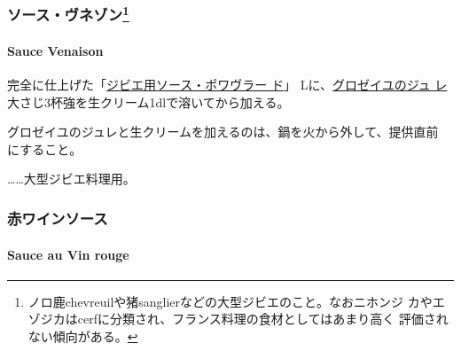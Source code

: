 \begin{recette}
\maeaki

\hypertarget{ux30bdux30fcux30b9ux30f4ux30cdux30beux30f395}{%
\subsubsection[ソース・ヴネゾン]{\texorpdfstring{ソース・ヴネゾン\footnote{ノロ鹿chevreuilや猪sanglierなどの大型ジビエのこと。なおニホンジ
  カやエゾジカはcerfに分類され、フランス料理の食材としてはあまり高く
  評価されない傾向がある。}}{ソース・ヴネゾン}}\label{ux30bdux30fcux30b9ux30f4ux30cdux30beux30f395}}

\hypertarget{sauce-venaison}{%
\paragraph{Sauce Venaison}\label{sauce-venaison}}


完全に仕上げた「\protect\hyperlink{sauce-poivrade-pour-gibier}{ジビエ用ソース・ポワヴラー
ド}」\troisquarts{} Lに、\protect\hyperlink{}{グロゼイユのジュ
レ}大さじ3杯強を生クリーム1dlで溶いてから加える。

グロゼイユのジュレと生クリームを加えるのは、鍋を火から外して、提供直前
にすること。

\ldots{}\ldots{}大型ジビエ料理用。

\maeaki

\hypertarget{ux8d64ux30efux30a4ux30f3ux30bdux30fcux30b9}{%
\subsubsection{赤ワインソース}\label{ux8d64ux30efux30a4ux30f3ux30bdux30fcux30b9}}

\hypertarget{sauce-au-vin-rouge}{%
\paragraph{Sauce au Vin rouge}\label{sauce-au-vin-rouge}}



\end{recette}
